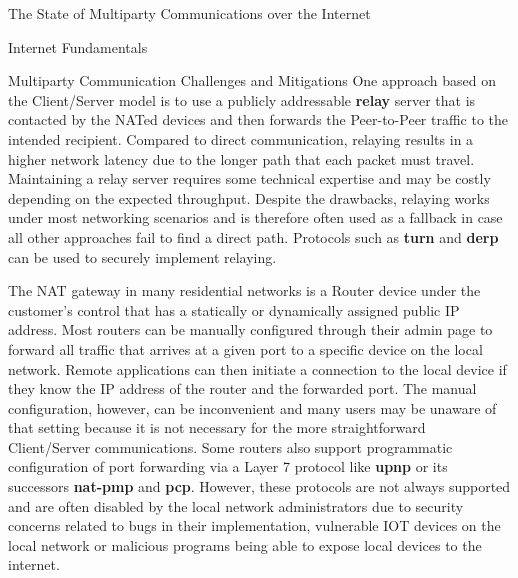 \begin{frame}[fragile]{The State of Multiparty Communications over the
Internet}
\begin{block}{Internet Fundamentals}
\begin{block}{Multiparty Communication Challenges and Mitigations}
One approach based on the Client/Server model is to use a publicly
addressable \textbf{relay} server that is contacted by the NATed devices
and then forwards the Peer-to-Peer traffic to the intended recipient.
Compared to direct communication, relaying results in a higher network
latency due to the longer path that each packet must travel. Maintaining
a relay server requires some technical expertise and may be costly
depending on the expected throughput. Despite the drawbacks, relaying
works under most networking scenarios and is therefore often used as a
fallback in case all other approaches fail to find a direct path.
Protocols such as \textbf{\acrfull{turn}} \autocite{turnRFC} and
\textbf{\acrfull{derp}} \autocite{derpDocs} can be used to securely
implement relaying.

The NAT gateway in many residential networks is a Router device under
the customer's control that has a statically or dynamically assigned
public IP address. Most routers can be manually configured through their
admin page to forward all traffic that arrives at a given port to a
specific device on the local network. Remote applications can then
initiate a connection to the local device if they know the IP address of
the router and the forwarded port. The manual configuration, however,
can be inconvenient and many users may be unaware of that setting
because it is not necessary for the more straightforward Client/Server
communications. Some routers also support programmatic configuration of
port forwarding via a Layer 7 protocol like \textbf{\gls{upnp}} or its
successors \textbf{\gls{nat-pmp}} and \textbf{\gls{pcp}}. However, these
protocols are not always supported and are often disabled by the local
network administrators due to security concerns related to bugs in their
implementation, vulnerable IOT devices on the local network or malicious
programs being able to expose local devices to the internet.



\end{block}
\end{block}
\end{frame}
